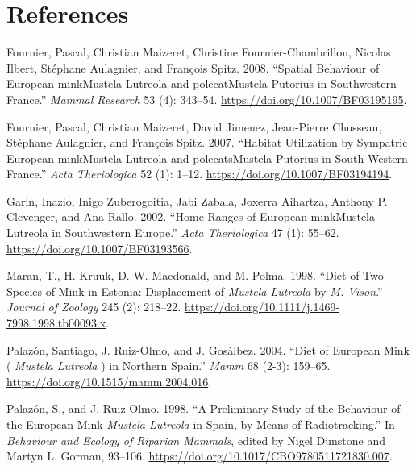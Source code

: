 \documentclass[
  letterpaper,
  DIV=11,
  numbers=noendperiod]{scrreprt}
\newlength{\cslhangindent}
\newenvironment{CSLReferences}[2] %
 {\begin{list}{}{%
  \setlength{\itemindent}{0pt}
  \setlength{\leftmargin}{0pt}
  \setlength{\parsep}{0pt}
  \ifodd #1
   \setlength{\leftmargin}{\cslhangindent}
   \setlength{\itemindent}{-1\cslhangindent}
  \fi
  \setlength{\itemsep}{#2\baselineskip}}}
 {\end{list}}
\begin{document}
\chapter*{References}\label{references}


\label{refs}
\begin{CSLReferences}{1}{0}
Fournier, Pascal, Christian Maizeret, Christine Fournier-Chambrillon,
Nicolas Ilbert, Stéphane Aulagnier, and François Spitz. 2008. {``Spatial
Behaviour of {European} {minkMustela} Lutreola and {polecatMustela}
Putorius in Southwestern {France}.''} \emph{Mammal Research} 53 (4):
343--54. \url{https://doi.org/10.1007/BF03195195}.

Fournier, Pascal, Christian Maizeret, David Jimenez, Jean-Pierre
Chusseau, Stéphane Aulagnier, and François Spitz. 2007. {``Habitat
Utilization by Sympatric {European} {minkMustela} Lutreola and
{polecatsMustela} Putorius in South-Western {France}.''} \emph{Acta
Theriologica} 52 (1): 1--12. \url{https://doi.org/10.1007/BF03194194}.

Garin, Inazio, Inigo Zuberogoitia, Jabi Zabala, Joxerra Aihartza,
Anthony P. Clevenger, and Ana Rallo. 2002. {``Home Ranges of {European}
{minkMustela} Lutreola in Southwestern {Europe}.''} \emph{Acta
Theriologica} 47 (1): 55--62. \url{https://doi.org/10.1007/BF03193566}.

Maran, T., H. Kruuk, D. W. Macdonald, and M. Polma. 1998. {``Diet of Two
Species of Mink in {Estonia}: Displacement of \emph{{Mustela} Lutreola}
by \emph{{M}. Vison}.''} \emph{Journal of Zoology} 245 (2): 218--22.
\url{https://doi.org/10.1111/j.1469-7998.1998.tb00093.x}.

Palazón, Santiago, J. Ruiz-Olmo, and J. Gosàlbez. 2004. {``Diet of
{European} Mink ( \emph{{Mustela} Lutreola} ) in {Northern} {Spain}.''}
\emph{Mamm} 68 (2-3): 159--65.
\url{https://doi.org/10.1515/mamm.2004.016}.

Palazón, S., and J. Ruiz-Olmo. 1998. {``A Preliminary Study of the
Behaviour of the {European} Mink \emph{{Mustela} Lutreola} in {Spain},
by Means of Radiotracking.''} In \emph{Behaviour and {Ecology} of
{Riparian} {Mammals}}, edited by Nigel Dunstone and Martyn L. Gorman,
93--106. \url{https://doi.org/10.1017/CBO9780511721830.007}.


\end{CSLReferences}
\end{document}
